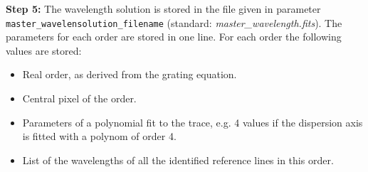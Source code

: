 \documentclass[10pt,a4paper]{article}
\begin{document}
\vspace{0.5em}\noindent \textbf{Step 5:} The wavelength solution is stored in the file given in parameter \verb|master_wavelensolution_filename| (standard: \textit{master\_wavelength.fits}). The parameters for each order are stored in one line. For each order the following values are stored:
\begin{itemize}
  \item Real order, as derived from the grating equation.
  \item Central pixel of the order.
  \item Parameters of a polynomial fit to the trace, e.g. 4 values if the dispersion axis is fitted with a polynom of order 4.
  \item List of the wavelengths of all the identified reference lines in this order.
\end{itemize}
\end{document}
